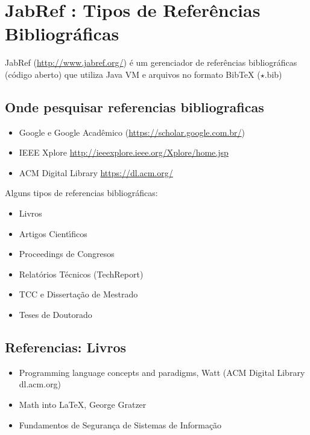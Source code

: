 


\section{JabRef : Tipos de Refer\^{e}ncias Bibliogr\'{a}ficas}

JabRef (\url{http://www.jabref.org/}) \'{e} um gerenciador de refer\^{e}ncias bibliogr\'{a}ficas (c\'{o}digo aberto) que utiliza Java VM e arquivos no formato BibTeX ($\star$.bib)

\subsection{Onde pesquisar referencias bibliograficas}
\begin{itemize}
  \item Google  e Google Acad\^{e}mico (\url{https://scholar.google.com.br/})
  \item IEEE Xplore \url{http://ieeexplore.ieee.org/Xplore/home.jsp}
  \item ACM Digital Library \url{https://dl.acm.org/}
\end{itemize}


Alguns tipos de referencias bibliogr\'{a}ficas:
\begin{itemize}
  \item Livros
  \item Artigos Cient\'{\i}ficos
  \item Proceedings de Congresos
  \item Relat\'{o}rios T\'{e}cnicos (TechReport)
  \item TCC e Disserta\c{c}\~{a}o de Mestrado
  \item Teses de Doutorado
\end{itemize}


\subsection{Referencias: Livros}
\begin{itemize}
  \item Programming language concepts and paradigms, Watt (ACM Digital Library dl.acm.org) \cite{watt1990}
  \item Math into {\LaTeX}, George Gratzer \cite{Gratzer2013}
  \item Fundamentos de Seguran\c{c}a de Sistemas de Informa\c{c}\~{a}o
\end{itemize}


